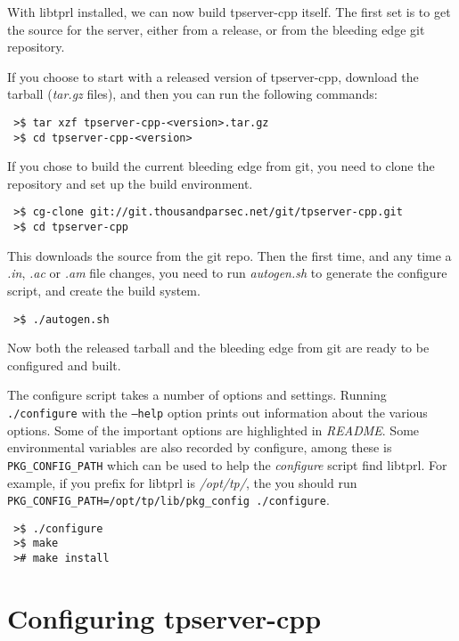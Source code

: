 \documentclass[a4paper,11pt]{report}
\newcommand{\filename}[1]{\emph{#1}}
\newcommand{\codename}[1]{\texttt{#1}}
\begin{document}


With libtprl installed, we can now build tpserver-cpp itself. The first set is to get the source for the server, either from a release, or from the bleeding edge git repository.

If you choose to start with a released version of tpserver-cpp, download the tarball (\filename{tar.gz} files), and then you can run the following commands:

\begin{verbatim}
 >$ tar xzf tpserver-cpp-<version>.tar.gz
 >$ cd tpserver-cpp-<version>
\end{verbatim}

If you chose to build the current bleeding edge from git, you need to clone the repository and set up the build environment.

\begin{verbatim}
 >$ cg-clone git://git.thousandparsec.net/git/tpserver-cpp.git
 >$ cd tpserver-cpp
\end{verbatim}

This downloads the source from the git repo.
Then the first time, and any time a \filename{.in}, \filename{.ac} or \filename{.am} file changes, you need to run \filename{autogen.sh} to generate the configure script, and create the build system.

\begin{verbatim}
 >$ ./autogen.sh
\end{verbatim}

Now both the released tarball and the bleeding edge from git are ready to be configured and built.

The configure script takes a number of options and settings. Running \codename{./configure} with the  \codename{--help} option prints out information about the various options. Some of the important options are highlighted in \filename{README}. Some environmental variables are also recorded by configure, among these is \codename{PKG\_CONFIG\_PATH} which can be used to help the \filename{configure} script find libtprl. For example, if you prefix for libtprl is \filename{/opt/tp/}, the you should run \codename{PKG\_CONFIG\_PATH=/opt/tp/lib/pkg\_config ./configure}.


\begin{verbatim}
 >$ ./configure
 >$ make
 ># make install
\end{verbatim}

\chapter{Configuring tpserver-cpp}
\label{chap:configure}
\end{document}
